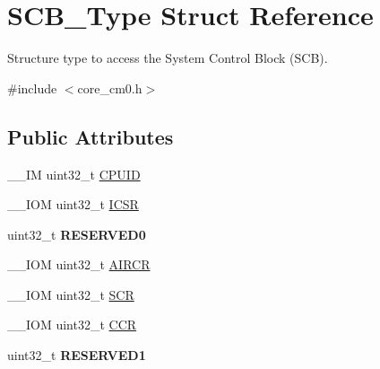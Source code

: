 \hypertarget{struct_s_c_b___type}{\section{S\-C\-B\-\_\-\-Type Struct Reference}
\label{struct_s_c_b___type}
}


Structure type to access the System Control Block (S\-C\-B).  




{\ttfamily \#include $<$core\-\_\-cm0.\-h$>$}

\subsection*{Public Attributes}
\begin{DoxyCompactItemize}
\item 
\-\_\-\-\_\-\-I\-M uint32\-\_\-t \hyperlink{struct_s_c_b___type_a21e08d546d8b641bee298a459ea73e46}{C\-P\-U\-I\-D}
\item 
\-\_\-\-\_\-\-I\-O\-M uint32\-\_\-t \hyperlink{struct_s_c_b___type_a0ca18ef984d132c6bf4d9b61cd00f05a}{I\-C\-S\-R}
\item 
\hypertarget{struct_s_c_b___type_a10960cdc703f661c83a237d9c69db23c}{uint32\-\_\-t {\bfseries R\-E\-S\-E\-R\-V\-E\-D0}}\label{struct_s_c_b___type_a10960cdc703f661c83a237d9c69db23c}

\item 
\-\_\-\-\_\-\-I\-O\-M uint32\-\_\-t \hyperlink{struct_s_c_b___type_ad3e5b8934c647eb1b7383c1894f01380}{A\-I\-R\-C\-R}
\item 
\-\_\-\-\_\-\-I\-O\-M uint32\-\_\-t \hyperlink{struct_s_c_b___type_a3a4840c6fa4d1ee75544f4032c88ec34}{S\-C\-R}
\item 
\-\_\-\-\_\-\-I\-O\-M uint32\-\_\-t \hyperlink{struct_s_c_b___type_a2d6653b0b70faac936046a02809b577f}{C\-C\-R}
\item 
\hypertarget{struct_s_c_b___type_adddd65958c1c4c0301f62ede0a9bf12e}{uint32\-\_\-t {\bfseries R\-E\-S\-E\-R\-V\-E\-D1}}\label{struct_s_c_b___type_adddd65958c1c4c0301f62ede0a9bf12e}


\end{DoxyCompactItemize}
